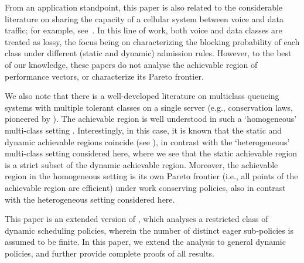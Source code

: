 From an application standpoint, this paper is also related to the
considerable literature on sharing the capacity of a cellular system
between voice and data traffic; for example,
see~\cite{Li04,Tang,Zhang}. In this line of work, both voice and data
classes are treated as lossy, the focus being on characterizing the
blocking probability of each class under different (static and
dynamic) admission rules. However, to the best of our knowledge, these
papers do not analyse the achievable region of performance vectors, or
characterize its Pareto frontier.

We also note that there is a well-developed literature on multiclass
queueing systems with multiple tolerant classes on a single server
(e.g., conservation laws, pioneered by \cite{Kleinrock1965}). The
achievable region is well understood in such a `homogeneous'
multi-class setting
\cite{coffman,shanthikumar1992multiclass}. Interestingly, in this
case, it is known that the static and dynamic achievable regions
coincide (see \cite{Value}), in contrast with the `heterogeneous'
multi-class setting considered here, where we see that the static
achievable region is a strict subset of the dynamic achievable region.
Moreover, the achievable region in the homogeneous setting is its own
Pareto frontier (i.e., all points of the achievable region are
efficient) under work conserving policies, also in contrast with the
heterogeneous setting considered here.

This paper is an extended version of \cite{Chaudhary2019}, which
analyses a restricted class of dynamic scheduling policies, wherein
the number of distinct eager sub-policies is assumed to be finite. In
this paper, we extend the analysis to general dynamic policies, and
further provide complete proofs of all results.








